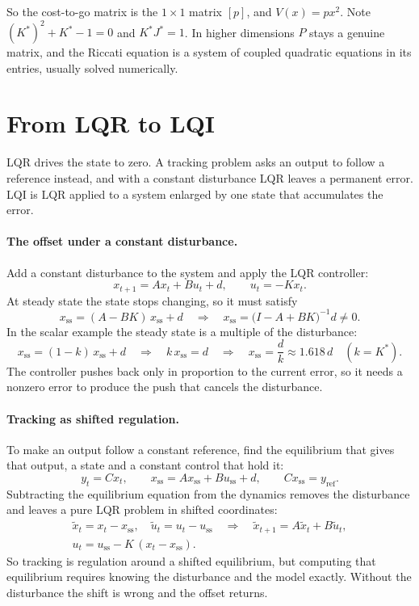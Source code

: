 \documentclass[11pt]{article}
\begin{document}
So the cost-to-go matrix is the $1 \times 1$ matrix $[p]$, and $V(x) = p x^2$. Note
$(K^*)^2 + K^* - 1 = 0$ and $K^* J^* = 1$. In higher dimensions $P$ stays a genuine matrix, and the
Riccati equation is a system of coupled quadratic equations in its entries, usually solved
numerically.

\section{From LQR to LQI}
\label{sec:lqi}

LQR drives the state to zero. A tracking problem asks an output to follow a reference instead, and
with a constant disturbance LQR leaves a permanent error. LQI is LQR applied to a system enlarged by
one state that accumulates the error.

\paragraph{The offset under a constant disturbance.} Add a constant disturbance to the system and
apply the LQR controller:
\[
  x_{t+1} = A x_t + B u_t + d, \qquad u_t = -K x_t .
\]
At steady state the state stops changing, so it must satisfy
\[
  x_{\mathrm{ss}} = (A - B K)\, x_{\mathrm{ss}} + d
  \quad\Longrightarrow\quad
  x_{\mathrm{ss}} = \big(I - A + B K\big)^{-1} d \neq 0 .
\]
In the scalar example the steady state is a multiple of the disturbance:
\[
  x_{\mathrm{ss}} = (1 - k)\, x_{\mathrm{ss}} + d
  \quad\Longrightarrow\quad k\, x_{\mathrm{ss}} = d
  \quad\Longrightarrow\quad x_{\mathrm{ss}} = \frac{d}{k} \approx 1.618\, d \quad (k = K^*).
\]
The controller pushes back only in proportion to the current error, so it needs a nonzero error to
produce the push that cancels the disturbance.

\paragraph{Tracking as shifted regulation.} To make an output follow a constant reference, find the
equilibrium that gives that output, a state and a constant control that hold it:
\[
  y_t = C x_t, \qquad x_{\mathrm{ss}} = A x_{\mathrm{ss}} + B u_{\mathrm{ss}} + d, \qquad
  C x_{\mathrm{ss}} = y_{\mathrm{ref}} .
\]
Subtracting the equilibrium equation from the dynamics removes the disturbance and leaves a pure LQR
problem in shifted coordinates:
\begin{gather*}
  \tilde x_t = x_t - x_{\mathrm{ss}}, \quad \tilde u_t = u_t - u_{\mathrm{ss}}
  \quad\Longrightarrow\quad
  \tilde x_{t+1} = A \tilde x_t + B \tilde u_t, \\
  u_t = u_{\mathrm{ss}} - K\,(x_t - x_{\mathrm{ss}}) .
\end{gather*}
So tracking is regulation around a shifted equilibrium, but computing that equilibrium requires
knowing the disturbance and the model exactly. Without the disturbance the shift is wrong and the
offset returns.
\end{document}

